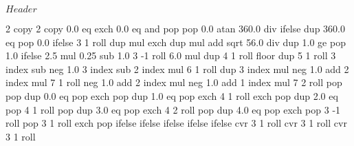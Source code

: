 %
%
%

\ProvidesFileRCS[v\pgfversion] $Header$


%
%

{\pgfpoint{-2cm}{-2cm}}
{\pgfpoint{2cm}{2cm}}
{}
{ %
  2 copy %
  2 copy 0.0 eq exch 0.0 eq and
  { pop pop 0.0 } %
  {atan 360.0 div} %
  ifelse  %
  dup 360.0 eq { pop 0.0 }{} ifelse %
  3 1 roll %
  dup mul %
  exch dup mul %
  add sqrt %
  56.0 div %
  dup 1.0 ge %
  { pop 1.0 }{} ifelse %
  2.5 mul 0.25 sub %
  1.0 %
  3 -1 roll 6.0 mul dup 4 1 roll %
  floor %
  dup 5 1 roll %
  3 index sub neg %
  1.0 3 index sub %
  2 index mul %
  6 1 roll %
  dup 3 index mul neg 1.0 add %
  2 index mul %
  7 1 roll %
  neg 1.0 add %
  2 index mul neg 1.0  add %
  1 index mul %
  7 2 roll %
  pop pop %
  dup 0.0 eq %
  { %
    pop exch pop
  }
  { dup 1.0 eq %
    { %
      pop exch 4 1 roll exch pop
    }
    { dup 2.0 eq %
      { %
      pop 4 1 roll pop
      }
      { dup 3.0 eq %
        { %
        pop exch 4 2 roll pop
        }
        { dup 4.0 eq %
          { %
          pop exch pop 3 -1 roll
          }
          { %
          pop 3 1 roll exch pop
          }
          ifelse
        }
        ifelse %
      }
      ifelse %
    }
    ifelse %
  }
  ifelse %
  cvr 3 1 roll cvr 3 1 roll cvr 3 1 roll
}


